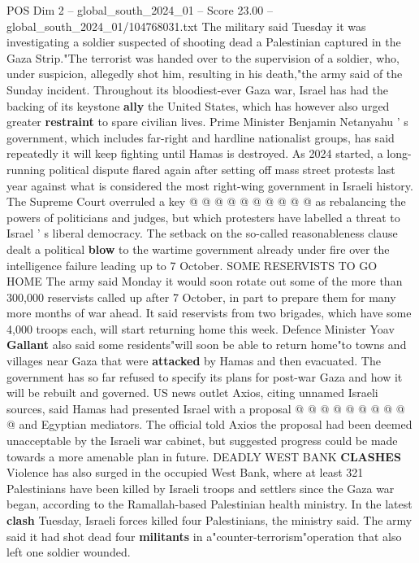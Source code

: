 \begin{textsample}{POS Dim 2 – global\_south\_2024\_01 – Score 23.00 – global\_south\_2024\_01/104768031.txt}
The military said Tuesday it was investigating a soldier suspected of shooting dead a Palestinian captured in the Gaza Strip."The terrorist was handed over to the supervision of a soldier, who, under suspicion, allegedly shot him, resulting in his death,"the army said of the Sunday incident.
Throughout its bloodiest-ever Gaza war, Israel has had the backing of its keystone \textbf{ally} the United States, which has however also urged greater \textbf{restraint} to spare civilian lives.
Prime Minister Benjamin Netanyahu ' s government, which includes far-right and hardline nationalist groups, has said repeatedly it will keep fighting until Hamas is destroyed.
As 2024 started, a long-running political dispute flared again after setting off mass street protests last year against what is considered the most right-wing government in Israeli history.
The Supreme Court overruled a key @ @ @ @ @ @ @ @ @ @ as rebalancing the powers of politicians and judges, but which protesters have labelled a threat to Israel ' s liberal democracy.
The setback on the so-called reasonableness clause dealt a political \textbf{blow} to the wartime government already under fire over the intelligence failure leading up to 7 October.
SOME RESERVISTS TO GO HOME The army said Monday it would soon rotate out some of the more than 300,000 reservists called up after 7 October, in part to prepare them for many more months of war ahead.
It said reservists from two brigades, which have some 4,000 troops each, will start returning home this week.
Defence Minister Yoav \textbf{Gallant} also said some residents"will soon be able to return home"to towns and villages near Gaza that were \textbf{attacked} by Hamas and then evacuated.
The government has so far refused to specify its plans for post-war Gaza and how it will be rebuilt and governed.
US news outlet Axios, citing unnamed Israeli sources, said Hamas had presented Israel with a proposal @ @ @ @ @ @ @ @ @ @ and Egyptian mediators.
The official told Axios the proposal had been deemed unacceptable by the Israeli war cabinet, but suggested progress could be made towards a more amenable plan in future.
DEADLY WEST BANK \textbf{CLASHES} Violence has also surged in the occupied West Bank, where at least 321 Palestinians have been killed by Israeli troops and settlers since the Gaza war began, according to the Ramallah-based Palestinian health ministry.
In the latest \textbf{clash} Tuesday, Israeli forces killed four Palestinians, the ministry said.
The army said it had shot dead four \textbf{militants} in a"counter-terrorism"operation that also left one soldier wounded.

\end{textsample}
